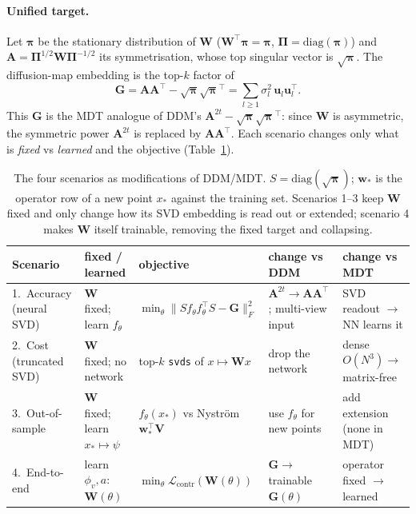 \documentclass[10pt,twocolumn]{article}
\newcommand{\W}{\mathbf{W}}
\newcommand{\A}{\mathbf{A}}
\newcommand{\Pii}{\boldsymbol{\Pi}}
\newcommand{\bp}{\boldsymbol{\pi}}
\begin{document}
\paragraph{Unified target.}
Let $\bp$ be the stationary distribution of $\W$ ($\W^\top\bp=\bp$, $\Pii=\mathrm{diag}(\bp)$) and
$\A=\Pii^{1/2}\W\Pii^{-1/2}$ its symmetrisation, whose top singular vector is $\sqrt{\bp}$. The
diffusion-map embedding is the top-$k$ factor of
\begin{equation}
\mathbf G=\A\A^\top-\sqrt{\bp}\sqrt{\bp}^\top=\textstyle\sum_{l\ge1}\sigma_l^2\,\mathbf u_l\mathbf u_l^\top .
\end{equation}
This $\mathbf G$ is the MDT analogue of DDM's $\A^{2t}-\sqrt{\bp}\sqrt{\bp}^\top$: since $\W$ is
asymmetric, the symmetric power $\A^{2t}$ is replaced by $\A\A^\top$. Each scenario changes only what
is \emph{fixed} vs \emph{learned} and the objective (Table~\ref{tab:scenarios}).

\begin{table}[t]\centering\footnotesize
\caption{The four scenarios as modifications of DDM/MDT. $S=\mathrm{diag}(\sqrt{\bp})$;
$\mathbf w_*$ is the operator row of a new point $x_*$ against the training set. Scenarios 1--3 keep
$\W$ fixed and only change how its SVD embedding is read out or extended; scenario 4 makes $\W$ itself
trainable, removing the fixed target and collapsing.}
\label{tab:scenarios}
\begin{tabular}{@{}p{2.15cm}p{2.7cm}p{3.85cm}p{3.15cm}p{3.05cm}@{}}
\toprule
Scenario & fixed / learned & objective & change vs DDM & change vs MDT\\
\midrule
1.\ Accuracy (neural SVD) & $\W$ fixed; learn $f_\theta$ & $\min_\theta\lVert S f_\theta f_\theta^\top S-\mathbf G\rVert_F^2$ & $\A^{2t}\!\to\!\A\A^\top$; multi-view input & SVD readout $\to$ NN learns it\\[4pt]
2.\ Cost (truncated SVD) & $\W$ fixed; no network & top-$k$ \texttt{svds} of $x\!\mapsto\!\W x$ & drop the network & dense $O(N^3)\!\to\!$ matrix-free\\[4pt]
3.\ Out-of-sample & $\W$ fixed; learn $x_*\!\mapsto\!\psi$ & $f_\theta(x_*)$ vs Nystr\"om $\mathbf w_*^\top\mathbf V$ & use $f_\theta$ for new points & add extension (none in MDT)\\[4pt]
4.\ End-to-end & learn $\phi_v,a$: $\W(\theta)$ & $\min_\theta\mathcal L_{\mathrm{contr}}(\W(\theta))$ & $\mathbf G\!\to\!$ trainable $\mathbf G(\theta)$ & operator fixed $\to$ learned\\
\bottomrule
\end{tabular}
\end{table}
\end{document}
